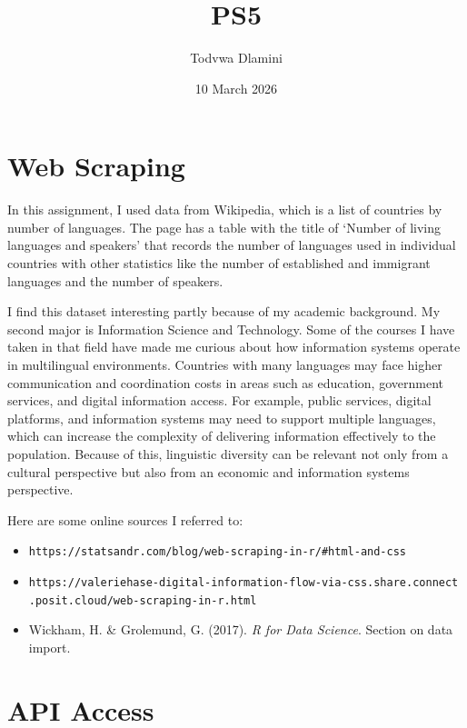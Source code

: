 \documentclass{article}
\title{PS5}
\author{Todvwa Dlamini}
\date{10 March 2026}
\begin{document}
\maketitle

\section*{Web Scraping}

In this assignment, I used data from Wikipedia, which is a list of countries by number of languages. The page has a table with the title of `Number of living languages and speakers' that records the number of languages used in individual countries with other statistics like the number of established and immigrant languages and the number of speakers.
\bigskip

I find this dataset interesting partly because of my academic background. My second major is Information Science and Technology. Some of the courses I have taken in that field have made me curious about how information systems operate in multilingual environments. Countries with many languages may face higher communication and coordination costs in areas such as education, government services, and digital information access. For example, public services, digital platforms, and information systems may need to support multiple languages, which can increase the complexity of delivering information effectively to the population. Because of this, linguistic diversity can be relevant not only from a cultural perspective but also from an economic and information systems perspective.
\bigskip

Here are some online sources I referred to:
\begin{itemize}
\item \texttt{https://statsandr.com/blog/web-scraping-in-r/\#html-and-css}
\item \texttt{https://valeriehase-digital-information-flow-via-css.share.connect
.posit.cloud/web-scraping-in-r.html}
\item Wickham, H. \& Grolemund, G. (2017). \textit{R for Data Science}. Section on data import.
\end{itemize}

\pagebreak

\section*{API Access}
\end{document}
